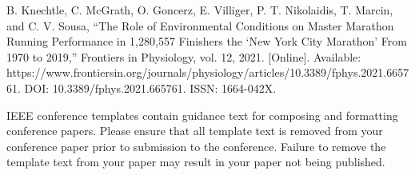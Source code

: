 \documentclass[conference]{IEEEtran}
\begin{document}
\begin{thebibliography}{00}
 B. Knechtle, C. McGrath, O. Goncerz, E. Villiger, P. T. Nikolaidis, T. Marcin, and C. V. Sousa, ``The Role of Environmental Conditions on Master Marathon Running Performance in 1,280,557 Finishers the ‘New York City Marathon’ From 1970 to 2019,'' Frontiers in Physiology, vol. 12, 2021. [Online]. Available: https://www.frontiersin.org/journals/physiology/articles/10.3389/fphys.2021.665761. DOI: 10.3389/fphys.2021.665761. ISSN: 1664-042X.


\end{thebibliography}
\vspace{12pt}
\color{red}
IEEE conference templates contain guidance text for composing and formatting conference papers. Please ensure that all template text is removed from your conference paper prior to submission to the conference. Failure to remove the template text from your paper may result in your paper not being published.
\end{document}
